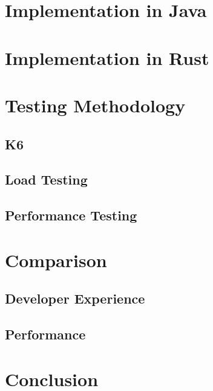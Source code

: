 \documentclass[a4paper,12pt]{article}
\begin{document}
	\section{Implementation in Java}
	\label{sec:java_implementation}

	\section{Implementation in Rust}
	\label{sec:rust_implementation}

	\section{Testing Methodology}
	\label{sec:testing_methodology}

	\subsection{K6}
	\label{subsec:k6}

	\subsection{Load Testing}
	\label{subsec:load_testing}

	\subsection{Performance Testing}
	\label{subsec:performance_testing}

	\section{Comparison}
	\label{sec:comparison}
	\subsection{Developer Experience}
	\subsection{Performance}
	
	\section{Conclusion}

	\newpage
\end{document}
